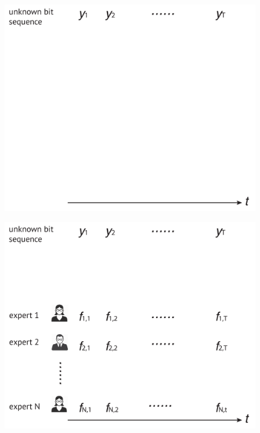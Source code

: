 \documentclass{beamer}
\begin{document}
\begin{frame}
\begin{figure}
\includegraphics[scale = 0.35]{figures/expert_problem_1.pdf}
\end{figure}
\end{frame}

\begin{frame}
\begin{figure}
\includegraphics[scale = 0.35]{figures/expert_problem_2.pdf}
\end{figure}
\end{frame}
\end{document}
